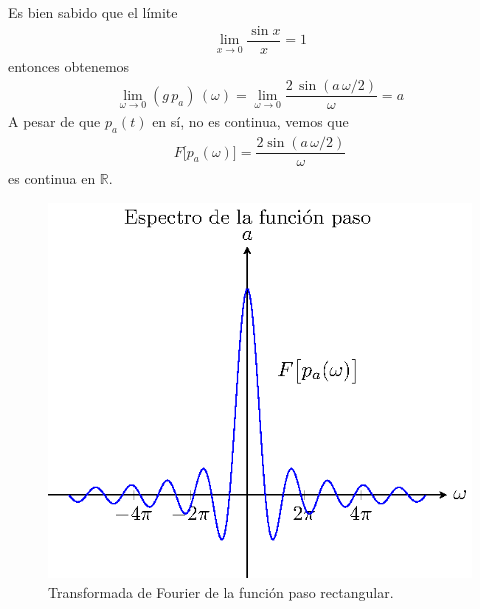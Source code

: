 Es bien sabido que el límite
\begin{align*}
\lim_{x \to 0} \dfrac{\sin x}{x} = 1
\end{align*}
entonces obtenemos 
\begin{align*}
\lim_{\omega \to 0}  (g \, p_{a}) \, (\omega) = \lim_{\omega \to 0} \dfrac{2 \, \sin (a \, \omega /2)}{\omega} = a
\end{align*}
A pesar de que $p_{a}(t)$ en sí, no es continua, vemos que
\begin{align}
F \big[p_{a}(\omega)\big] = \dfrac{2 \sin (a \, \omega/2)}{\omega}
\label{eq:ecuacion_06_11_Beerends}
\end{align}
es continua en $\mathbb{R}$.
\begin{figure}[H]
    \centering
    \includegraphics[scale=1]{Imagenes/T_Funcionpaso.eps}
    \caption{Transformada de Fourier de la función paso rectangular.}
    \label{fig:figura_Tfuncionpaso}
\end{figure}
%     

